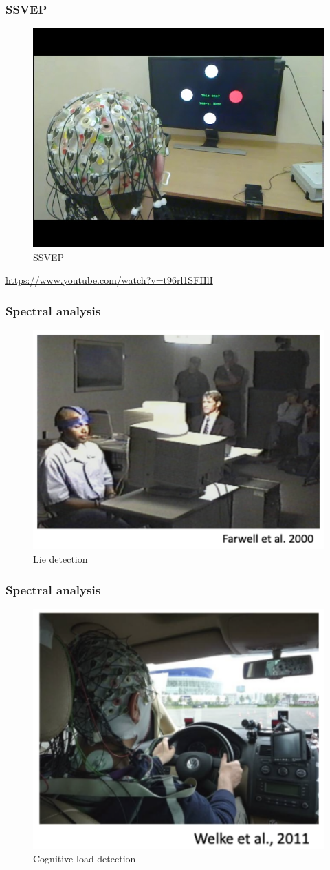 \documentclass{beamer}
\begin{document}
\begin{frame}
\frametitle{SSVEP} 
\begin{figure}
	\includegraphics[width=0.4\linewidth]{image/ssvep}
	\caption{SSVEP}
\end{figure}
\centering
\url{https://www.youtube.com/watch?v=t96rl1SFHlI}
\end{frame}

\begin{frame}
\frametitle{Spectral analysis} 
\begin{figure}
	\includegraphics[width=0.7\linewidth]{image/s1}
	\caption{Lie detection}
\end{figure}
\end{frame}

\begin{frame}
\frametitle{Spectral analysis} 
\begin{figure}
	\includegraphics[width=0.6\linewidth]{image/s2}
	\caption{Cognitive load detection}
\end{figure}
\end{frame}
\end{document}
